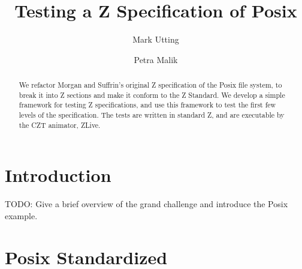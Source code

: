 \documentclass{llncs}
\begin{document}
\pagestyle{headings}  %
%
\title{Testing a Z Specification of Posix}
%
\author{Mark Utting \and Petra Malik}
%
%
%

\maketitle              %

\begin{abstract}
We refactor Morgan and Suffrin's original Z specification of the
Posix file system, to break it into Z sections and make it conform
to the Z Standard.  We develop a simple framework for testing Z
specifications, and use this framework to test the first few levels
of the specification.  The tests are written in standard Z, and are
executable by the CZT animator, ZLive.
\end{abstract}

\section{Introduction}

TODO: Give a brief overview of the grand challenge and introduce the
Posix example. \cite{Hoa03}


\section{Posix Standardized}
\end{document}

